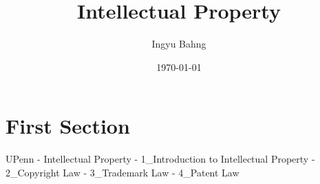\documentclass[10pt]{article}
\title{Intellectual Property}
\date{\today}
\author{Ingyu Bahng}
\begin{document}


\section{First Section}

UPenn - Intellectual Property
- 1_Introduction to Intellectual Property
- 2_Copyright Law
- 3_Trademark Law
- 4_Patent Law
  
\end{document}
